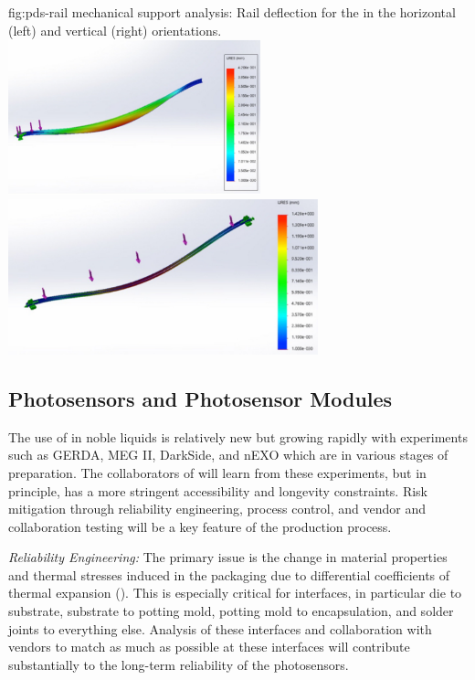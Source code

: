 
\begin{dunefigure}{fig:pds-rail}
{ mechanical support analysis: Rail deflection for the  in the horizontal (left) and vertical (right) orientations.}
	\includegraphics[height=4.5cm]{graphics/pds-rail-deflec-apa-flat.pdf} 
	\includegraphics[height=4.5cm]{graphics/pds-rail-deflec-apa-vert.pdf}\\
\end{dunefigure}


\subsection{Photosensors and Photosensor Modules}
\label{sec:fdsp-pd-assy-psm}

The use of  in noble liquids is relatively new but growing rapidly with experiments such as GERDA, MEG II, DarkSide, and nEXO which are in various stages of preparation. The collaborators of  will learn from these experiments, but in principle,  has a more stringent accessibility and longevity constraints. Risk mitigation through reliability engineering, process control, and vendor and collaboration testing will be a key feature of the   production process.

{\textit{Reliability Engineering:}} The primary issue is the change in material properties and thermal stresses induced in the packaging due to differential coefficients of thermal expansion (). This is especially critical for interfaces, in particular
die to substrate, substrate to potting mold, potting mold to encapsulation, and solder joints to everything else. Analysis of these interfaces and collaboration with vendors to match  as much as possible at these interfaces will contribute substantially to the long-term reliability of the photosensors.

